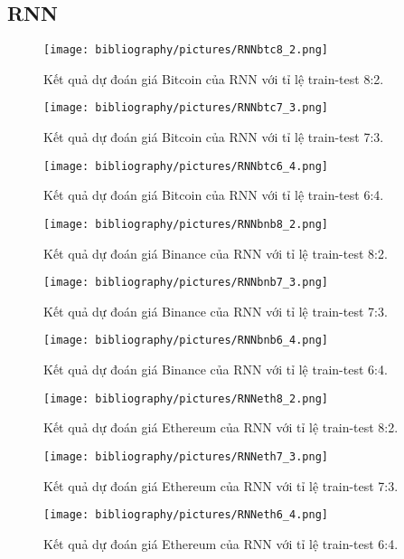 \subsection{RNN}
\begin{figure}[h]
    \centering
    \texttt{[image: bibliography/pictures/RNNbtc8\_2.png]}
    \caption{Kết quả dự đoán giá Bitcoin của RNN với tỉ lệ train-test 8:2.}
\end{figure}
\begin{figure}[h]
    \centering
    \texttt{[image: bibliography/pictures/RNNbtc7\_3.png]}
    \caption{Kết quả dự đoán giá Bitcoin của RNN với tỉ lệ train-test 7:3.}
\end{figure}
\begin{figure}[h]
    \centering
    \texttt{[image: bibliography/pictures/RNNbtc6\_4.png]}
    \caption{Kết quả dự đoán giá Bitcoin của RNN với tỉ lệ train-test 6:4.}
\end{figure}
\begin{figure}[h]
    \centering
    \texttt{[image: bibliography/pictures/RNNbnb8\_2.png]}
    \caption{Kết quả dự đoán giá Binance của RNN với tỉ lệ train-test 8:2.}
\end{figure}
\begin{figure}[h]
    \centering
    \texttt{[image: bibliography/pictures/RNNbnb7\_3.png]}
    \caption{Kết quả dự đoán giá Binance của RNN với tỉ lệ train-test 7:3.}
\end{figure}
\begin{figure}[h]
    \centering
    \texttt{[image: bibliography/pictures/RNNbnb6\_4.png]}
    \caption{Kết quả dự đoán giá Binance của RNN với tỉ lệ train-test 6:4.}
\end{figure}
\begin{figure}[h]
    \centering
    \texttt{[image: bibliography/pictures/RNNeth8\_2.png]}
    \caption{Kết quả dự đoán giá Ethereum của RNN với tỉ lệ train-test 8:2.}
\end{figure}
\begin{figure}[h]
    \centering
    \texttt{[image: bibliography/pictures/RNNeth7\_3.png]}
    \caption{Kết quả dự đoán giá Ethereum của RNN với tỉ lệ train-test 7:3.}
\end{figure}
\begin{figure}[h]
    \centering
    \texttt{[image: bibliography/pictures/RNNeth6\_4.png]}
    \caption{Kết quả dự đoán giá Ethereum của RNN với tỉ lệ train-test 6:4.}
\end{figure}